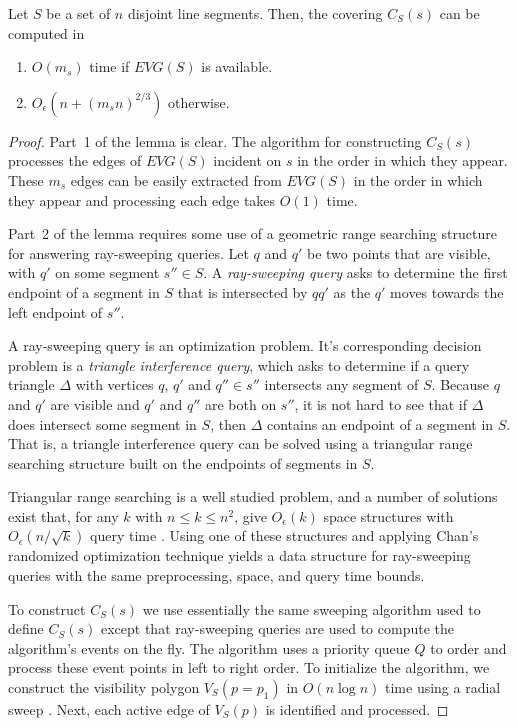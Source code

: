 \documentclass{patmorin}
\newcommand{\EVG}{\mathit{EVG}}
\newcommand{\Oe}{O_\epsilon}
\begin{document}
\begin{lem}
  Let $S$ be a set of $n$ disjoint line segments.  Then, the covering
  $C_S(s)$ can be computed in
  \begin{enumerate}
    \item $O(m_s)$ time if $\EVG(S)$ is available.
    \item $\Oe(n+(m_s n)^{2/3})$ otherwise.
  \end{enumerate}
\end{lem}

\begin{proof}
Part~1 of the lemma is clear. The algorithm for constructing $C_S(s)$
processes the edges of $\EVG(S)$ incident on $s$ in the order in which
they appear.  These $m_s$ edges can be easily extracted from $\EVG(S)$ in
the order in which they appear and processing each edge takes $O(1)$ time.

Part~2 of the lemma requires some use of a geometric range searching
structure for answering ray-sweeping queries.  Let $q$ and $q'$ be
two points that are visible, with $q'$ on some segment $s''\in S$.  A
\emph{ray-sweeping query} asks to determine the first endpoint of a segment
in $S$ that is intersected by $qq'$ as the $q'$ moves towards the left
endpoint of $s''$.

A ray-sweeping query is an optimization problem.  It's corresponding
decision problem is a \emph{triangle interference query}, which asks to
determine if a query triangle $\Delta$ with vertices $q$, $q'$ and $q''\in
s''$ intersects any segment of $S$.  Because $q$ and $q'$ are visible and
$q'$ and $q''$ are both on $s''$, it is not hard to see that if $\Delta$
does intersect some segment in $S$, then $\Delta$ contains an endpoint of a
segment in $S$.  That is, a triangle interference query can be solved using
a triangular range searching structure built on the endpoints of segments
in $S$.

Triangular range searching is a well studied problem, and a number of
solutions exist that, for any $k$ with $n\le k\le n^2$, give $\Oe(k)$
space structures with $\Oe(n/\sqrt{k})$ query time \cite[Section~4]{ae99}.
Using one of these structures and applying Chan's randomized optimization
technique \cite[Theorem~3.2]{c99} yields a data structure for ray-sweeping
queries with the same preprocessing, space, and query time bounds.

To construct $C_S(s)$ we use essentially the same sweeping algorithm used
to define $C_S(s)$ except that ray-sweeping queries are used to compute
the algorithm's events on the fly.  The algorithm uses a priority queue
$Q$ to order and process these event points in left to right order.
To initialize the algorithm, we construct the visibility polygon
$V_S(p=p_1)$ in $O(n\log n)$ time using a radial sweep \cite{a85,so84}.
Next, each active edge of $V_S(p)$ is identified and processed.


\end{proof}
\end{document}
